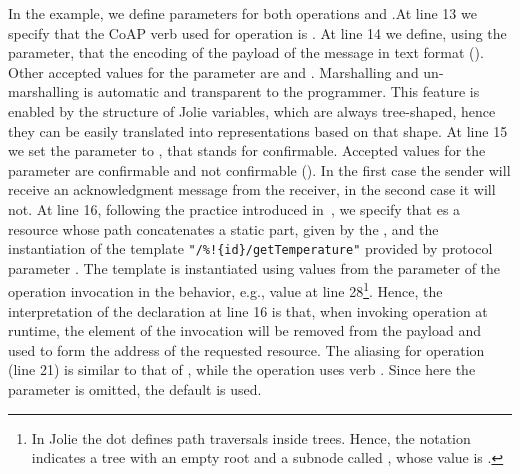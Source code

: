 In the example, we define  parameters for both operations
 and .\@ At line 13 we specify that the CoAP verb
used for operation  is . At line 14 we define, using
the  parameter, that the encoding of the payload of the
message in text format (). Other accepted values for the
 parameter are  and . Marshalling
and un-marshalling is automatic and transparent to the programmer. This feature
is enabled by the structure of Jolie variables, which are always tree-shaped,
hence they can be easily translated into representations based on that shape.
At line 15 we set the  parameter to
, that stands for confirmable. Accepted values for the
 parameter are confirmable and not confirmable
(). In the first
case the sender will receive an acknowledgment message from the receiver, in
the second case it will not. At line 16, following the practice introduced
in~\cite{montesi16}, we specify that
 es a resource whose path concatenates a static part,
given by the , and the instantiation of the template
\lstinline|"/%!{id}/getTemperature"| provided by protocol parameter
. The template is instantiated using values from the parameter of
the operation invocation in the behavior, e.g., value  at line
28\footnote{In Jolie the dot  defines path traversals inside trees.
Hence, the notation  indicates a tree with an empty root and
a subnode called , whose value is .}. Hence, the
interpretation of the declaration at line 16 is that, when invoking operation
 at runtime, the element
 of the invocation will be removed from the payload and used to form
the address of the requested resource. The aliasing for operation
 (line 21) is similar to that of , while the
operation uses verb . Since here the 
parameter is omitted, the default  is used.

